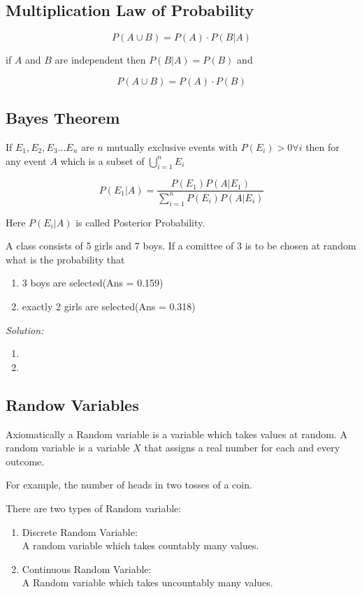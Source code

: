 \documentclass[11pt,letterpaper]{article}
\newenvironment{problem}[2][Problem]                                  
        {\begin{tcolorbox}[colback=white,colframe=gray!50,title=#1 #2]}
        {\end{tcolorbox}}
\newenvironment{solution}                      
        {\begin{mdframed}\textit{Solution:} \\}
        {\end{mdframed}}
\begin{document}
\subsection{Multiplication Law of Probability}
\[
  P(A\cup B) = P(A) \cdot P( B \vert A )
\]

if $A$ and $B$ are independent then $ P( B \vert A ) = P(B)$ and 

\[
  P(A\cup B) = P(A) \cdot P( B )
\]

\subsection{Bayes Theorem}
If $E_1, E_2, E_3 \dots E_n$ are $n$ mutually exclusive events with $P(E_i) > 0 \forall i$ then for any event $A$ 
which is a subset of $\bigcup_{i=1}^n E_i$ 

\[
  P(E_1 \vert A) = \frac{P(E_1) P(A \vert E_1)}{\sum_{i=1}^n{P(E_i) P(A \vert E_i)}}
\]

Here $P(E_i \vert A)$ is called Posterior Probability.

\begin{problem}8
  A class consists of 5 girls and 7 boys. If a comittee of 3 is to be chosen at random what is the probability that 
  \begin{enumerate}
    \item 3 boys are selected\hfill (Ans = 0.159)
    \item exactly 2 girls are selected\hfill (Ans = 0.318)
  \end{enumerate}
\end{problem}
\begin{solution}
  \begin{enumerate}
    \item 
    \item 
  \end{enumerate}
\end{solution}

\subsection{Randow Variables}
Axiomatically a Random variable is a variable which takes values at random.
A random variable is a variable $X$ that assigns a real number for each and every outcome. 

For example, the number of heads in two tosses of a coin.

There are two types of Random variable:
\begin{enumerate}
  \item Discrete Random Variable: \\
    A random variable which takes countably many values. 
  \item Continuous Random Variable: \\ 
    A Random variable which takes uncountably many values.
\end{enumerate}
\end{document}
